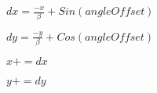 \documentclass{article}
\begin{document}
$dx = \frac{-x}{\beta} + Sin(angleOffset)$
\pagebreak

$dy = \frac{-y}{\beta} + Cos(angleOffset)$
\pagebreak

$x += dx$
\pagebreak

$y += dy$
\pagebreak
\end{document}
